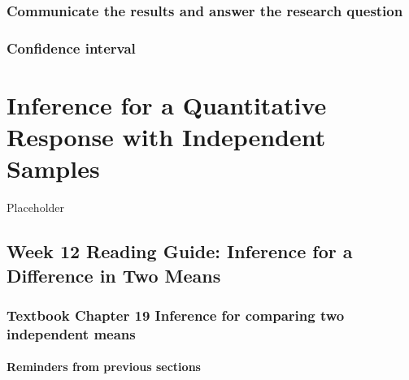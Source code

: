 \documentclass[
]{report}
\begin{document}
\hypertarget{communicate-the-results-and-answer-the-research-question-3}{%
\subsection*{Communicate the results and answer the research question}\label{communicate-the-results-and-answer-the-research-question-3}}

\hypertarget{confidence-interval-6}{%
\subsection*{Confidence interval}\label{confidence-interval-6}}

\hypertarget{inference-for-a-quantitative-response-with-independent-samples}{%
\chapter{Inference for a Quantitative Response with Independent Samples}\label{inference-for-a-quantitative-response-with-independent-samples}}

Placeholder

\hypertarget{week-12-reading-guide-inference-for-a-difference-in-two-means}{%
\section{Week 12 Reading Guide: Inference for a Difference in Two Means}\label{week-12-reading-guide-inference-for-a-difference-in-two-means}}

\hypertarget{textbook-chapter-19-inference-for-comparing-two-independent-means}{%
\subsection*{Textbook Chapter 19 Inference for comparing two independent means}\label{textbook-chapter-19-inference-for-comparing-two-independent-means}}

\hypertarget{reminders-from-previous-sections-10}{%
\subsubsection*{Reminders from previous sections}\label{reminders-from-previous-sections-10}}
\end{document}
